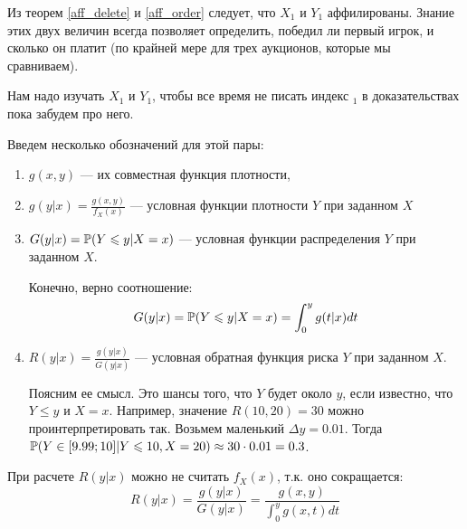 Из теорем \ref{aff_delete} и \ref{aff_order} следует, что $ X_{1} $ и $ Y_{1} $ аффилированы. Знание этих двух величин всегда позволяет определить, победил ли первый игрок, и сколько он платит (по крайней мере для трех аукционов, которые мы сравниваем). 

Нам надо изучать $ X_{1} $ и $ Y_{1} $, чтобы все время не писать индекс $ _{1} $ в доказательствах пока забудем про него.

Введем несколько обозначений для этой пары:
\begin{enumerate}
\item $ g(x,y) $ --- их совместная функция плотности,
\item $ g(y|x)=\frac{g(x,y)}{f_{X}(x)} $ --- условная функции плотности $ Y $ при заданном $ X $
\item $ G(y|x)=\P(Y\leq y|X=x)$ --- условная функции распределения $ Y $ при заданном $ X $.

Конечно, верно соотношение:
\begin{equation}
G(y|x)=\P(Y\leq y|X=x)=\int_{0}^{y}g(t|x)dt
\end{equation}

\item $ R(y|x)=\frac{g(y|x)}{G(y|x)} $ --- условная обратная функция риска $ Y $ при заданном $ X $.

Поясним ее смысл. Это шансы того, что $ Y $ будет около $ y $, если известно, что $ Y\leq y $ и $ X=x $. Например, значение $ R(10,20)=30 $ можно проинтерпретировать так. Возьмем маленький $ \Delta y=0.01 $. Тогда $ \P(Y\in [9.99;10]|Y\leq 10, X=20)\approx 30\cdot 0.01=0.3 $.
\end{enumerate}

При расчете $ R(y|x) $ можно не считать $ f_{X}(x) $, т.к. оно сокращается:
\begin{equation}
R(y|x)=\frac{g(y|x)}{G(y|x)}=\frac{g(x,y)}{\int_{0}^{y}g(x,t)dt}
\end{equation}

